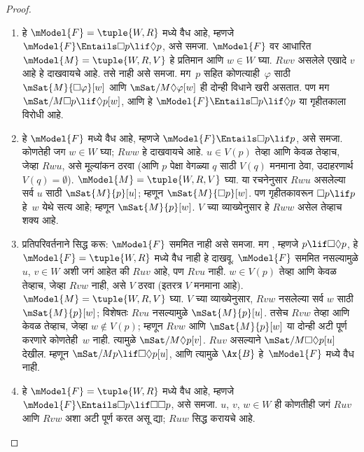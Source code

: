 \begin{proof}
  \begin{enumerate}
  \item {} हे $\mModel{F} = \tuple{W, R}$ मध्ये वैध आहे,
    म्हणजे $\mModel{F} \Entails \Box p \lif \Diamond p$,
    असे समजा. $\mModel{F}$ वर आधारित
    $\mModel{M} = \tuple{W, R, V}$ हे प्रतिमान आणि
    $w \in W$ घ्या. $Rwv$ असलेले एखादे $v$ आहे हे
    दाखवायचे आहे. तसे नाही असे समजा. मग~$p$ सहित
    कोणत्याही~$\varphi$ साठी $\mSat{M}{\Box \varphi}[w]$ आणि
    $\mSat/{M}{\Diamond \varphi}[w]$ ही दोन्ही विधाने खरी
    असतात. पण मग $\mSat/{M}{\Box p \lif
      \Diamond p}[w]$, आणि हे $\mModel{F}
    \Entails \Box p \lif \Diamond p$ या गृहीतकाला
    विरोधी आहे.
  \item {} हे $\mModel{F}$ मध्ये वैध आहे,
    म्हणजे $\mModel{F} \Entails \Box
    p \lif p$, असे समजा. कोणतेही जग $w \in W$ घ्या;
    $Rww$ हे दाखवायचे आहे. $u \in V(p)$ तेव्हा आणि
    केवळ तेव्हाच, जेव्हा $Rwu$, असे मूल्यांकन
    ठरवा (आणि $p$ पेक्षा वेगळ्या $q$ साठी $V(q)$
    मनमाना ठेवा, उदाहरणार्थ $V(q) = \emptyset$).
    $\mModel{M} = \tuple{W, R, V}$ घ्या. या रचनेनुसार
    $Rwu$ असलेल्या सर्व $u$ साठी $\mSat{M}{p}[u]$;
    म्हणून $\mSat{M}{\Box p}[w]$. पण गृहीतकावरून
    $\Box p \lif p$ हे~$w$ येथे सत्य आहे; म्हणून
    $\mSat{M}{p}[w]$. $V$ च्या व्याख्येनुसार हे
    $Rww$ असेल तेव्हाच शक्य आहे.
  \item प्रतिपरिवर्तनाने सिद्ध करू: $\mModel{F}$ सममित
    नाही असे समजा. मग , म्हणजे
    $p \lif \Box\Diamond p$, हे
    $\mModel{F}= \tuple{W, R}$ मध्ये वैध नाही हे
    दाखवू. $\mModel{F}$ सममित नसल्यामुळे
    $u$, $v \in W$ अशी जगं आहेत की $Ruv$ आहे,
    पण $Rvu$ नाही. $w \in V(p)$ तेव्हा आणि केवळ
    तेव्हाच, जेव्हा $Rvw$ नाही, असे $V$ ठरवा (इतरत्र
    $V$ मनमाना आहे). $\mModel{M} =\tuple{W, R,
      V}$ घ्या. $V$ च्या व्याख्येनुसार, $Rvw$
    नसलेल्या सर्व $w$ साठी $\mSat{M}{p}[w]$;
    विशेषतः $Rvu$ नसल्यामुळे $\mSat{M}{p}[u]$.
    तसेच $Rvw$ तेव्हा आणि केवळ तेव्हाच, जेव्हा
    $w \notin V(p)$; म्हणून $Rvw$ आणि
    $\mSat{M}{p}[w]$ या दोन्ही अटी पूर्ण करणारे
    कोणतेही~$w$ नाही. त्यामुळे
    $\mSat/{M}{\Diamond p}[v]$. $Ruv$ असल्याने
    $\mSat/{M}{\Box\Diamond p}[u]$ देखील. म्हणून
    $\mSat/{M}{p \lif
      \Box\Diamond p}[u]$, आणि त्यामुळे
    $\Ax{B}$ हे~$\mModel{F}$ मध्ये वैध नाही.
  \item {} हे $\mModel{F} = \tuple{W,R}$ मध्ये
    वैध आहे, म्हणजे $\mModel{F} \Entails \Box p
    \lif \Box\Box p$, असे समजा. $u$, $v$, $w \in W$
    ही कोणतीही जगं $Ruv$ आणि $Rvw$ अशा अटी पूर्ण
    करत असू द्या; $Ruw$ सिद्ध करायचे आहे.

\end{enumerate}
\end{proof}
